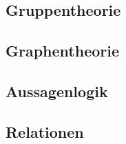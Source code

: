 \documentclass[10pt,a4paper]{article}
\begin{document}
\subsection{Gruppentheorie}



\subsection{Graphentheorie}




\subsection{Aussagenlogik}



\subsection{Relationen}
\end{document}
